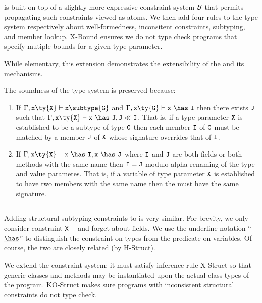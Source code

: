  is built on top of a slightly more expressive
constraint system $\cal B$ that permits propagating such
constraints viewed as atoms. We then
add four rules to the type system respectively about
well-formedness, inconsitent constraints, subtyping, and member
lookup. {\sc X-Bound} ensures we do not type check programs
that specify mutiple bounds for a given type
parameter.%

While elementary, this extension demonstrates the extensibility of the \FXGL{\cdot} and its mechanisms.

The soundness of the type system is preserved because:
\begin{enumerate}
\item If $\Gamma,{\tt x}\ty{\tt X}\vdash{\tt x}\subtype{\tt G}$ and $\Gamma,{\tt x}\ty{\tt G}\vdash{\tt x}~\has~{\tt I}$ then there exists $\tt J$ such that $\Gamma,{\tt x}\ty{\tt X}\vdash{\tt x}~\has~{\tt J}, {\tt J} \ll {\tt I}$. That is, if a type parameter $\tt X$ is established to be a subtype of type $\tt G$ then each member $\tt I$ of $\tt G$ must be matched by a member $\tt J$ of $\tt X$ whose signature overrides that of $\tt I$.

\item If $\Gamma,{\tt x}\ty{\tt X}\vdash{\tt x}~\has~{\tt I},{\tt x}~\has~{\tt J}$ where $\tt I$ and $\tt J$ are both fields or both methods with the same name then ${\tt I}={\tt J}$ modulo alpha-renaming of the type and value parametes. That is, if a variable of type parameter $\tt X$ is established to have two members with the same name then the must have the same signature.
\end{enumerate}



\subsection{}
Adding structural subtyping constraints to \FXGL{\cdot} is very similar. For brevity, we only consider constraint {\tt X}~\underline{\has}~ and forget about fields. We use the underline notation ``$\underline{\has}$'' to distinguish the constraint on types from the predicate on variables. Of course, the two are closely related (by {\sc H-Struct}).

We extend the constraint system: it must satisfy inference rule {\sc X-Struct} so that generic classes and methods may be instantiated upon the actual class types of the program. {\sc KO-Struct} makes sure programs with inconsistent structural constraints do not type check.




